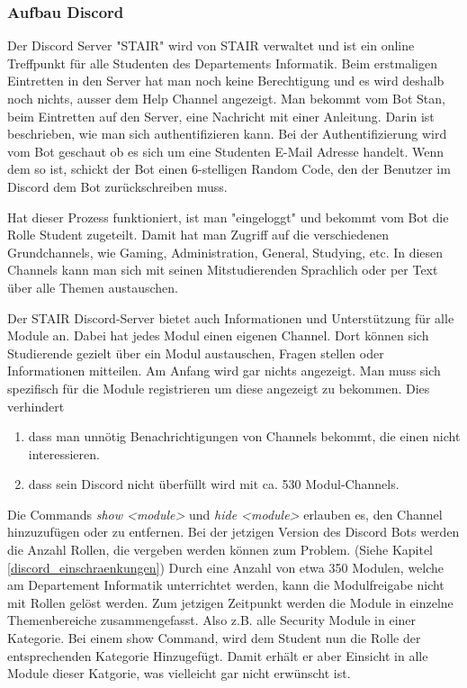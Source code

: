 \documentclass[a4paper, table]{article}
\begin{document}
\subsubsection{Aufbau Discord}
Der Discord Server "STAIR" wird von STAIR verwaltet und ist ein online Treffpunkt f\"ur alle Studenten des Departements Informatik.
Beim erstmaligen Eintretten in den Server hat man noch keine Berechtigung und es wird deshalb noch nichts, ausser dem Help Channel
angezeigt. Man bekommt vom Bot Stan, beim Eintretten auf den Server, eine Nachricht mit einer Anleitung. Darin ist beschrieben, wie
man sich authentifizieren kann. Bei der Authentifizierung wird vom Bot geschaut ob es sich um eine Studenten E-Mail Adresse handelt.
Wenn dem so ist, schickt der Bot einen 6-stelligen Random Code, den der Benutzer im Discord dem Bot zur\"uckschreiben muss.

Hat dieser Prozess funktioniert, ist man "eingeloggt" und bekommt vom Bot die Rolle Student zugeteilt. Damit hat man Zugriff auf
die verschiedenen Grundchannels, wie Gaming, Administration, General, Studying, etc.
In diesen Channels kann man sich mit seinen Mitstudierenden Sprachlich oder per Text \"uber alle Themen austauschen.
\newline

Der STAIR Discord-Server bietet auch Informationen und Unterst\"utzung f\"ur alle Module an. Dabei hat jedes Modul einen eigenen Channel.
Dort k\"onnen sich Studierende gezielt \"uber ein Modul austauschen, Fragen stellen oder Informationen mitteilen.
Am Anfang wird gar nichts angezeigt. Man muss sich spezifisch f\"ur die Module registrieren um diese angezeigt zu bekommen. Dies verhindert

\begin{enumerate}
    \item dass man unn\"otig Benachrichtigungen von Channels bekommt, die einen nicht interessieren.
    \item dass sein Discord nicht \"uberf\"ullt wird mit ca. 530 Modul-Channels.
\end{enumerate}

Die Commands \textit{show <module>} und \textit{hide <module>} erlauben es, den Channel hinzuzuf\"ugen oder zu entfernen.
Bei der jetzigen Version des Discord Bots werden die Anzahl Rollen, die vergeben werden können zum Problem.
(Siehe Kapitel \ref{discord_einschraenkungen})
Durch eine Anzahl von etwa 350 Modulen, welche am Departement Informatik unterrichtet werden, 
kann die Modulfreigabe nicht mit Rollen gelöst werden.
Zum jetzigen Zeitpunkt werden die Module in einzelne Themenbereiche zusammengefasst.
Also z.B. alle Security Module in einer Kategorie.
Bei einem show Command, wird dem Student nun die Rolle der entsprechenden Kategorie Hinzugefügt.
Damit erhält er aber Einsicht in alle Module dieser Katgorie, was vielleicht gar nicht erwünscht ist.
\newline
\end{document}
